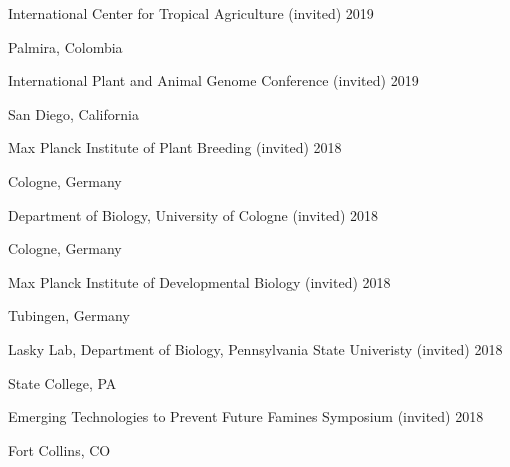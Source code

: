 \documentclass[12pt,english]{article}
\begin{document}
\hspace*{1.0em}International Center for Tropical Agriculture (invited) \hfill 2019 \par
\hspace*{2.0em}Palmira, Colombia \par\vspace{0.5ex}

\hspace*{1.0em}International Plant and Animal Genome Conference (invited) \hfill 2019 \par
\hspace*{2.0em}San Diego, California \par\vspace{0.5ex}

\hspace*{1.0em}Max Planck Institute of Plant Breeding (invited) \hfill 2018 \par
\hspace*{2.0em}Cologne, Germany \par\vspace{0.5ex}

\hspace*{1.0em}Department of Biology, University of Cologne (invited) \hfill 2018 \par
\hspace*{2.0em}Cologne, Germany \par\vspace{0.5ex}

\hspace*{1.0em}Max Planck Institute of Developmental Biology (invited) \hfill 2018 \par
\hspace*{2.0em}Tubingen, Germany  \par\vspace{0.5ex}

\hspace*{1.0em}Lasky Lab, Department of Biology, Pennsylvania State Univeristy (invited) \hfill 2018 \par
\hspace*{2.0em}State College, PA \par\vspace{0.5ex}

\hspace*{1.0em}Emerging Technologies to Prevent Future Famines Symposium (invited) \hfill 2018 \par
\hspace*{2.0em}Fort Collins, CO \par\vspace{0.5ex}
\end{document}
